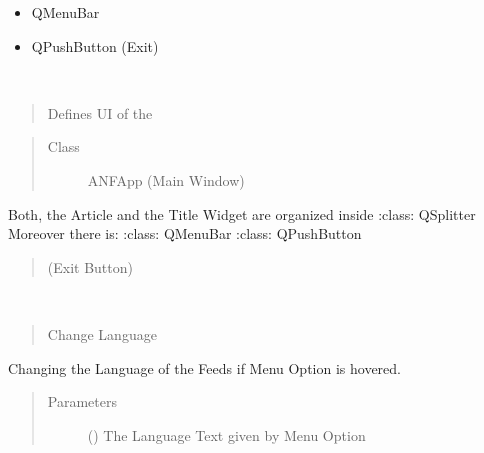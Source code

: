 \documentclass[letterpaper,10pt,english]{sphinxmanual}
\begin{document}
\begin{fulllineitems}
\begin{description}
\begin{itemize}
\item {} 
QMenuBar

\item {} 
QPushButton (Exit)

\end{itemize}

\end{description}

\begin{fulllineitems}
\label{\detokenize{anfrss.gui:anfrss.gui.guiapp.ANFApp.anfInit}}~\begin{quote}

Defines UI of the
\end{quote}
\begin{quote}\begin{description}
\item[{Class}] \leavevmode
ANFApp
(Main Window)

\end{description}\end{quote}

Both, the Article
and the Title Widget
are organized inside
:class: QSplitter
Moreover there is:
:class: QMenuBar
:class: QPushButton
\begin{quote}

(Exit Button)
\end{quote}

\end{fulllineitems}


\begin{fulllineitems}
\label{\detokenize{anfrss.gui:anfrss.gui.guiapp.ANFApp.languageAction}}~\begin{quote}

Change Language
\end{quote}

Changing the Language
of the Feeds if Menu
Option is hovered.
\begin{quote}\begin{description}
\item[{Parameters}] \leavevmode
{} () \textendash{} The Language
Text given by Menu Option


\end{description}
\end{quote}
\end{fulllineitems}
\end{fulllineitems}
\end{document}
